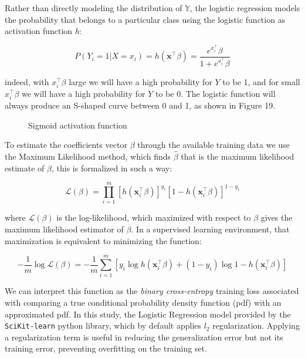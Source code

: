 \documentclass{article}
\begin{document}
Rather than directly modeling the distribution of $\mathbb{Y}$, the logistic regression models the probability that  belongs to a particular class using the logistic function as activation
function \emph{h}:

\begin{equation}
P(Y_{i} = 1|X=x_{i}) = h(\textbf{x}^{\top}\beta) = \frac{e^{x_{i}^{\top}}\beta}{1+e^{x_{i}^{\top}}\beta} 
\end{equation}

indeed, with $x_{i}^{\top}\beta$ large we will have a high probability for $Y$ to be 1, and for small $x_{i}^{\top}\beta$ we will have a high probability for $Y$ to be 0. The logistic function will always produce an
S-shaped curve between 0 and 1, as shown in Figure 19.

\begin{figure}[h]
\centering

\caption{Sigmoid activation function}
\end{figure}

To estimate the coefficients vector $\beta$ through the available training data we use the Maximum Likelihood method, which finds $\hat{\beta}$ that is the maximum likelihood estimate of $\beta$, this is formalized in such a way:

\begin{equation}
\mathcal{L}(\beta) = \prod_{i=1}^{m}[h(\textbf{x}_{i}^{\top}\beta)]^{y_{i}}[1-h(\textbf{x}_{i}^{\top}\beta)]^{1-{y_{i}}}
\end{equation}

where $\mathcal{L}(\beta)$ is the log-likelihood, which maximized with respect to $\beta$ gives the maximum likelihood estimator of $\beta$. In a supervised learning environment, that maximization is equivalent to minimizing the function:

\begin{equation}
-\frac{1}{m}\log \mathcal{L}(\beta) = -\frac{1}{m}\sum_{i=1}^{m}[y_{i}\log h(\textbf{x}_{i}^{\top}\beta) + (1-y_{i})\log 1 - h(\textbf{x}_{i}^{\top}\beta)]
\end{equation}

We can interpret this function as the \emph{binary cross-entropy} training loss associated with comparing a true conditional probability density function (pdf) with an approximated pdf.
In this study, the Logistic Regression model provided by the \texttt{SciKit-learn} python library, which by default applies $l_{2}$ regularization. Applying a regularization term is useful in reducing the generalization error but not its training error, preventing overfitting on the training set. 
\end{document}
